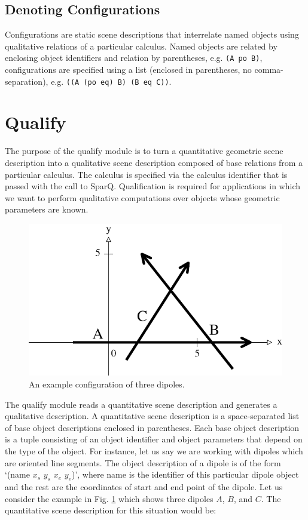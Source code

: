 \documentclass[headsepline]{scrreprt}
\theoremstyle{definition}
\newlength{\rest}
\newcommand{\engine}{SparQ}
\begin{document}
\subsection{Denoting Configurations}
Configurations are static scene descriptions that interrelate named objects using qualitative relations of a particular calculus. Named objects are related by enclosing object identifiers and relation by parentheses, e.g. \verb=(A po B)=, configurations are specified using a list (enclosed in parentheses, no comma-separation), e.g. \verb=((A (po eq) B) (B eq C))=.

\section{Qualify}\label{sec:qualification}


The purpose of the qualify module is to turn a quantitative geometric scene
description into a qualitative scene description composed of base relations
from a particular calculus. The calculus is specified via the calculus
identifier that is passed with
the call to \engine{}. Qualification is
required for applications in which we want
to perform qualitative computations over objects whose geometric parameters
are known.

\begin{figure}[htp]
  \centering
  \includegraphics[width=.45\textwidth]{dipol-example}
  \caption{An example configuration of three dipoles.}
  \label{fig:dipol-example}
\end{figure}

The qualify module reads a quantitative scene description and
generates a qualitative description. A quantitative
scene description is a space-separated list of base object descriptions
enclosed in parentheses. Each base object description is a tuple consisting of
an object identifier and object parameters that depend on the type of the
object. For instance, let us say we are working with dipoles which
are oriented line segments. The object description of a dipole is of the
form `(name $x_s$ $y_s$ $x_e$ $y_e$)', where name is the identifier of this
particular dipole object and the rest are the coordinates of start
and end point of the dipole.
Let us consider the example in Fig.
\ref{fig:dipol-example} which shows three dipoles $A$, $B$, and $C$. The quantitative scene description for this
situation would be:
\end{document}
